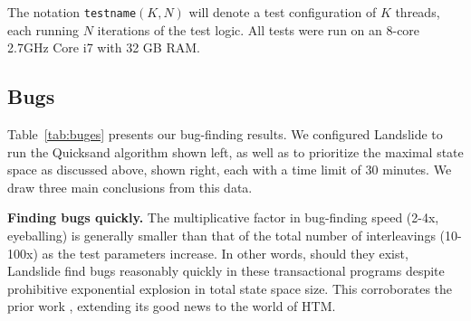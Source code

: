 \documentclass[10pt]{sigplanconf}
\begin{document}
The notation {\tt testname}$(K,N)$ will denote a test configuration of $K$ threads, each running $N$ iterations of the test logic.
All tests were run on an 8-core 2.7GHz Core i7 with 32 GB RAM.

\subsection{Bugs}

Table~\ref{tab:buges}
presents our bug-finding results.
We configured Landslide to run the Quicksand algorithm \cite{quicksand}
shown left,
as well as to prioritize the maximal state space as discussed above,
shown right,
each with a time limit of 30 minutes.
We draw three main conclusions from this data.

		{\bf Finding bugs quickly.}
		The multiplicative factor in bug-finding speed (2-4x, eyeballing) is generally smaller
		than that of the total number of interleavings (10-100x)
		as the test parameters increase.
		In other words,
		should they exist,
		Landslide find bugs reasonably quickly in these transactional programs
		despite prohibitive exponential explosion in total state space size.
		This corroborates the prior work \cite{quicksand},
		extending its good news to the world of HTM.
\end{document}
